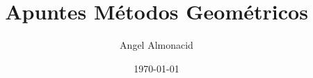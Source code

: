
\usepackage[most]{tcolorbox}
\usepackage{aleph-comandos}
\usepackage{enumitem}
\usepackage{amssymb}
\usepackage{titling}
\usepackage[a4paper,margin=1in]{geometry}
\usepackage{multicol}
\title{Apuntes Métodos Geométricos}
\author{Angel Almonacid}
\date{\today}



\newcommand{\caja}[3]{%
  \begin{tcolorbox}[colback=#1!5!white,colframe=#1!25!black,title=#2]
    #3
  \end{tcolorbox}%
}




